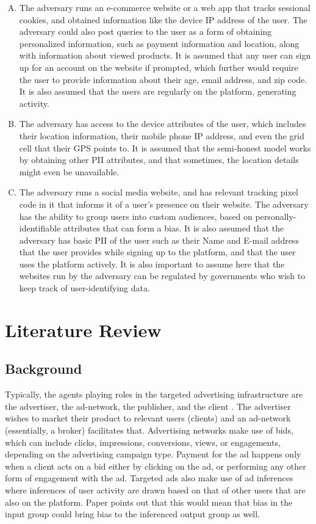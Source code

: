 \documentclass[sigconf,nonacm]{acmart}
\begin{document}
\begin{enumerate}[A.]
 \item The adversary runs an e-commerce website or a web app that tracks sessional cookies, and obtained information like the device IP address of the user. The adversary could also post queries to the user as a form of obtaining personalized information, such as payment information and location, along with information about viewed products. It is assumed that any user can sign up for an account on the website if prompted, which further would require the user to provide information about their age, email address, and zip code. It is also assumed that the users are regularly on the platform, generating activity.
 \item The adversary has access to the device attributes of the user, which includes their location information, their mobile phone IP address, and even the grid cell that their GPS points to. It is assumed that the semi-honest model works by obtaining other PII attributes, and that sometimes, the location details might even be unavailable. 
 \item The adversary runs a social media website, and has relevant tracking pixel code in it that informs it of a user’s presence on their website. The adversary has the ability to group users into custom audiences, based on personally-identifiable attributes that can form a bias. It is also assumed that the adversary has basic PII of the user such as their Name and E-mail address that the user provides while signing up to the platform, and that the user uses the platform actively. It is also important to assume here that the websites run by the adversary can be regulated by governments who wish to keep track of user-identifying data.
\end{enumerate}

\section{Literature Review}
\subsection{Background}
 Typically, the agents playing roles in the targeted advertising infrastructure are the advertiser, the ad-network, the publisher, and the client \cite{oblivad}. The advertiser wishes to market their product to relevant users (clients) and an ad-network (essentially, a broker) facilitates that. 
Advertising networks make use of bids, which can include clicks, impressions, conversions, views, or engagements, depending on the advertising campaign type. Payment for the ad happens only when a client acts on a bid either by clicking on the ad, or performing any other form of engagement with the ad. Targeted ads also make use of ad inferences where inferences of user activity are drawn based on that of other users that are also on the platform. Paper \cite{whattwitterknows} points out that this would mean that bias in the input group could bring bias to the inferenced output group as well. 
\end{document}
